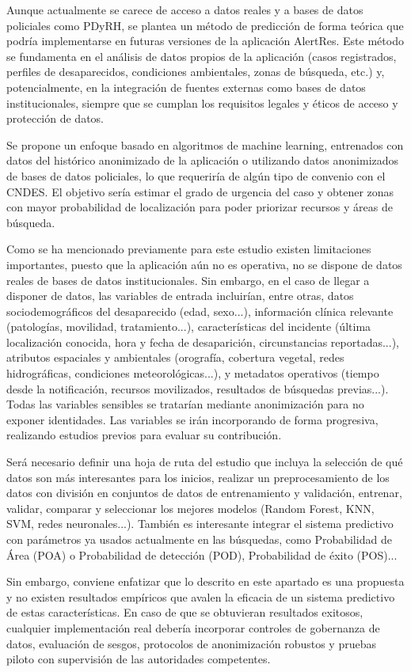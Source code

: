 Aunque actualmente se carece de acceso a datos reales y a bases de datos policiales como PDyRH, se plantea un método de predicción de forma teórica que podría implementarse en futuras versiones de la aplicación AlertRes. Este método se fundamenta en el análisis de datos propios de la aplicación (casos registrados, perfiles de desaparecidos, condiciones ambientales, zonas de búsqueda, etc.) y, potencialmente, en la integración de fuentes externas como bases de datos institucionales, siempre que se cumplan los requisitos legales y éticos de acceso y protección de datos.

Se propone un enfoque basado en algoritmos de machine learning, entrenados con datos del histórico anonimizado de la aplicación o utilizando datos anonimizados de bases de datos policiales, lo que requeriría de algún tipo de convenio con el CNDES. El objetivo sería estimar el grado de urgencia del caso y obtener zonas con mayor probabilidad de localización para poder priorizar recursos y áreas de búsqueda.

Como se ha mencionado previamente para este estudio existen limitaciones importantes, puesto que la aplicación aún no es operativa, no se dispone de datos reales de bases de datos institucionales. Sin embargo, en el caso de llegar a disponer de datos, las variables de entrada incluirían, entre otras, datos sociodemográficos del desaparecido (edad, sexo...), información clínica relevante (patologías, movilidad, tratamiento...), características del incidente (última localización conocida, hora y fecha de desaparición, circunstancias reportadas...), atributos espaciales y ambientales (orografía, cobertura vegetal, redes hidrográficas, condiciones meteorológicas...), y metadatos operativos (tiempo desde la notificación, recursos movilizados, resultados de búsquedas previas...). Todas las variables sensibles se tratarían mediante anonimización para no exponer identidades. Las variables se irán incorporando de forma progresiva, realizando estudios previos para evaluar su contribución.

Será necesario definir una hoja de ruta del estudio que incluya la selección de qué datos son más interesantes para los inicios, realizar un preprocesamiento de los datos con división en conjuntos de datos de entrenamiento y validación, entrenar, validar, comparar y seleccionar los mejores modelos (Random Forest, KNN, SVM, redes neuronales...). También es interesante integrar el sistema predictivo con parámetros ya usados actualmente en las búsquedas, como Probabilidad de Área (POA) o Probabilidad de detección (POD), Probabilidad de éxito (POS)... \cite{ManualDeBusquedayRescate}

Sin embargo, conviene enfatizar que lo descrito en este apartado es una propuesta y no existen resultados empíricos que avalen la eficacia de un sistema predictivo de estas características. En caso de que se obtuvieran resultados exitosos, cualquier implementación real debería incorporar controles de gobernanza de datos, evaluación de sesgos, protocolos de anonimización robustos y pruebas piloto con supervisión de las autoridades competentes.